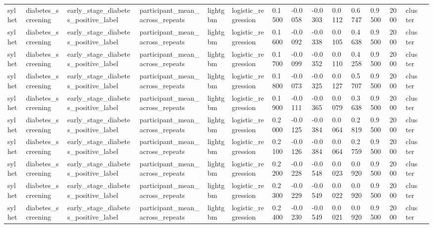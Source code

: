 \begin{tabular}{lllllllllllllll}
sylhet & diabetes\_screening & early\_stage\_diabetes\_positive\_label & participant\_mean\_across\_repeats & lightgbm & logistic\_regression & 0.1500 & -0.0058 & -0.0303 & 0.0112 & 0.6747 & 0.9500 & 2000 & cluster &  \\
sylhet & diabetes\_screening & early\_stage\_diabetes\_positive\_label & participant\_mean\_across\_repeats & lightgbm & logistic\_regression & 0.1600 & -0.0092 & -0.0338 & 0.0105 & 0.4638 & 0.9500 & 2000 & cluster &  \\
sylhet & diabetes\_screening & early\_stage\_diabetes\_positive\_label & participant\_mean\_across\_repeats & lightgbm & logistic\_regression & 0.1700 & -0.0099 & -0.0352 & 0.0110 & 0.4258 & 0.9500 & 2000 & cluster &  \\
sylhet & diabetes\_screening & early\_stage\_diabetes\_positive\_label & participant\_mean\_across\_repeats & lightgbm & logistic\_regression & 0.1800 & -0.0073 & -0.0325 & 0.0127 & 0.5707 & 0.9500 & 2000 & cluster &  \\
sylhet & diabetes\_screening & early\_stage\_diabetes\_positive\_label & participant\_mean\_across\_repeats & lightgbm & logistic\_regression & 0.1900 & -0.0111 & -0.0365 & 0.0079 & 0.3638 & 0.9500 & 2000 & cluster &  \\
sylhet & diabetes\_screening & early\_stage\_diabetes\_positive\_label & participant\_mean\_across\_repeats & lightgbm & logistic\_regression & 0.2000 & -0.0125 & -0.0384 & 0.0064 & 0.2819 & 0.9500 & 2000 & cluster &  \\
sylhet & diabetes\_screening & early\_stage\_diabetes\_positive\_label & participant\_mean\_across\_repeats & lightgbm & logistic\_regression & 0.2100 & -0.0126 & -0.0384 & 0.0064 & 0.2759 & 0.9500 & 2000 & cluster &  \\
sylhet & diabetes\_screening & early\_stage\_diabetes\_positive\_label & participant\_mean\_across\_repeats & lightgbm & logistic\_regression & 0.2200 & -0.0228 & -0.0548 & 0.0023 & 0.0920 & 0.9500 & 2000 & cluster &  \\
sylhet & diabetes\_screening & early\_stage\_diabetes\_positive\_label & participant\_mean\_across\_repeats & lightgbm & logistic\_regression & 0.2300 & -0.0229 & -0.0549 & 0.0022 & 0.0920 & 0.9500 & 2000 & cluster &  \\
sylhet & diabetes\_screening & early\_stage\_diabetes\_positive\_label & participant\_mean\_across\_repeats & lightgbm & logistic\_regression & 0.2400 & -0.0230 & -0.0549 & 0.0021 & 0.0920 & 0.9500 & 2000 & cluster &  \\

\end{tabular}
